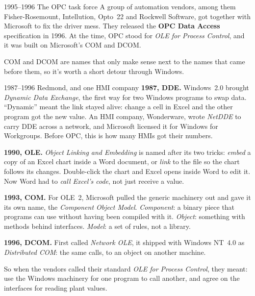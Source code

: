 \begin{history}{1995--1996 \textperiodcentered{} The OPC task force}
A group of automation vendors, among them Fisher-Rosemount, Intellution, Opto~22
and Rockwell Software, got together with Microsoft to fix the driver mess. They
released the \textbf{OPC Data Access} specification in 1996. At the time, OPC
stood for \emph{OLE for Process Control}, and it was built on Microsoft's COM and
DCOM.
\end{history}

COM and DCOM are names that only make sense next to the names that came before
them, so it's worth a short detour through Windows.

\begin{history}{1987--1996 \textperiodcentered{} Redmond, and one HMI company}
\textbf{1987, DDE.} Windows~2.0 brought \emph{Dynamic Data Exchange}, the first
way for two Windows programs to swap data. ``Dynamic'' meant the link stayed
alive: change a cell in Excel and the other program got the new value. An HMI
company, Wonderware, wrote \emph{NetDDE} to carry DDE across a network, and
Microsoft licensed it for Windows for Workgroups. Before OPC, this is how many
HMIs got their numbers.

\textbf{1990, OLE.} \emph{Object Linking and Embedding} is named after its two
tricks: \emph{embed} a copy of an Excel chart inside a Word document, or
\emph{link} to the file so the chart follows its changes. Double-click the chart
and Excel opens inside Word to edit it. Now Word had to \emph{call Excel's code},
not just receive a value.

\textbf{1993, COM.} For OLE~2, Microsoft pulled the generic machinery out and
gave it its own name, the \emph{Component Object Model}. \emph{Component}: a
binary piece that programs can use without having been compiled with it.
\emph{Object}: something with methods behind interfaces. \emph{Model}: a set of
rules, not a library.

\textbf{1996, DCOM.} First called \emph{Network OLE}, it shipped with Windows
NT~4.0 as \emph{Distributed COM}: the same calls, to an object on another
machine.

So when the vendors called their standard \emph{OLE for Process Control}, they
meant: use the Windows machinery for one program to call another, and agree on
the interfaces for reading plant values.
\end{history}

